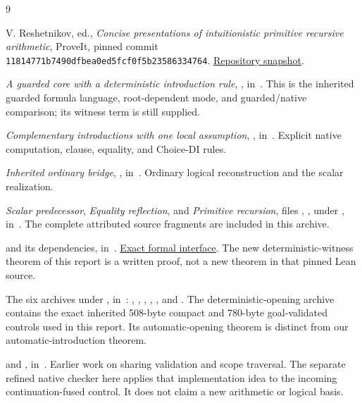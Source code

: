 \documentclass[11pt,letterpaper]{article}
\theoremstyle{definition}\newtheorem{definition}[theorem]{Definition}
\theoremstyle{remark}\newtheorem{remark}[theorem]{Remark}
\begin{document}
\begin{thebibliography}{9}\raggedright
{}
V. Reshetnikov, ed., \emph{Concise presentations of intuitionistic primitive
recursive arithmetic}, ProveIt, pinned commit
\texttt{11814771b7490dfbea0ed5fcf0f5b23586334764}.
\href{https://github.com/VladimirReshetnikov/ProveIt/tree/11814771b7490dfbea0ed5fcf0f5b23586334764/Logic/PrimitiveRecursiveArithmetic/ConciseIPRA}{Repository snapshot}.

\emph{A guarded core with a deterministic introduction rule},
, in~\cite{repo}.
This is the inherited guarded formula language, root-dependent mode, and
guarded/native comparison; its witness term is still supplied.

\emph{Complementary introductions with one local assumption},
,
in~\cite{repo}. Explicit native computation, clause, equality, and
Choice-DI rules.

\emph{Inherited ordinary bridge},
,
in~\cite{repo}. Ordinary logical reconstruction and the scalar realization.

\emph{Scalar predecessor}, \emph{Equality reflection}, and
\emph{Primitive recursion}, files
, ,
 under
, in~\cite{repo}.
The complete attributed source fragments are included in this archive.

 and its dependencies,
in~\cite{repo}.
\href{https://github.com/VladimirReshetnikov/ProveIt/blob/11814771b7490dfbea0ed5fcf0f5b23586334764/Logic/PrimitiveRecursiveArithmetic/ConciseIPRA/Lean/ConciseIPRA/NativeBiInterpretation.lean}{Exact formal interface}.
The new deterministic-witness theorem of this report is a written proof,
not a new theorem in that pinned Lean source.

The six archives under , in~\cite{repo}:
,
,
,
,
, and
.
The deterministic-opening archive contains the exact inherited 508-byte
compact and 780-byte goal-validated controls used in this report. Its
automatic-opening theorem is distinct from our automatic-introduction theorem.

 and ,
in~\cite{repo}. Earlier work on sharing validation and scope traversal.
The separate refined native checker here applies that implementation idea
to the incoming continuation-fused control. It does not claim a new
arithmetic or logical basis.
\end{thebibliography}
\end{document}
